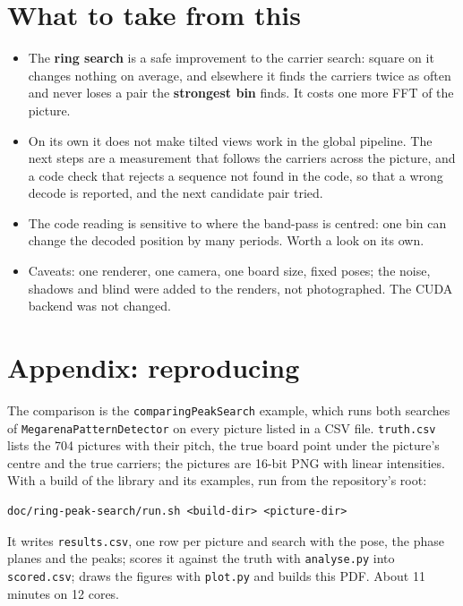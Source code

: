 \documentclass[10pt,a4paper]{article}
\newcommand{\maxs}{\textcolor{maxorange}{\textbf{strongest bin}}}
\newcommand{\ring}{\textcolor{ringblue}{\textbf{ring search}}}
\begin{document}
\section{What to take from this}

\begin{itemize}
  \item The \ring{} is a safe improvement to the carrier search: square on it
        changes nothing on average, and elsewhere it finds the carriers twice
        as often and never loses a pair the \maxs{} finds. It costs one more
        FFT of the picture.
  \item On its own it does not make tilted views work in the global pipeline.
        The next steps are a measurement that follows the carriers across the
        picture, and a code check that rejects a sequence not found in the
        code, so that a wrong decode is reported, and the next candidate pair
        tried.
  \item The code reading is sensitive to where the band-pass is centred: one
        bin can change the decoded position by many periods. Worth a look on
        its own.
  \item Caveats: one renderer, one camera, one board size, fixed poses; the
        noise, shadows and blind were added to the renders, not photographed.
        The CUDA backend was not changed.
\end{itemize}

\section*{Appendix: reproducing}

The comparison is the \texttt{comparingPeakSearch} example, which runs both
searches of \texttt{MegarenaPatternDetector} on every picture listed in a CSV
file. \texttt{truth.csv} lists the 704 pictures with their pitch, the true
board point under the picture's centre and the true carriers; the pictures
are 16-bit PNG with linear intensities. With a build of the library and its
examples, run from the repository's root:

\begin{verbatim}
doc/ring-peak-search/run.sh <build-dir> <picture-dir>
\end{verbatim}

\noindent It writes \texttt{results.csv}, one row per picture and search with
the pose, the phase planes and the peaks; scores it against the truth with
\texttt{analyse.py} into \texttt{scored.csv}; draws the figures with
\texttt{plot.py} and builds this PDF. About 11 minutes on 12 cores.
\end{document}
